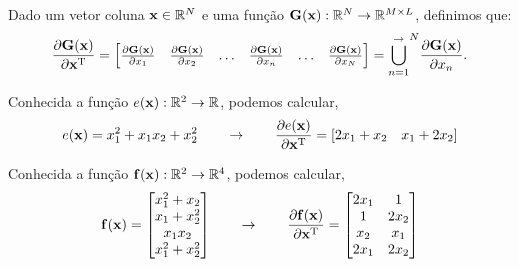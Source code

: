 \begin{definition}\label{def:deltahor3}
Dado 
um vetor coluna $\VECTOR{x}\in \mathbb{R}^N$ e 
uma função $\MATRIX{G}(\VECTOR{x}): \mathbb{R}^N \rightarrow \mathbb{R}^{M\times L}$, 
definimos que:
\begin{equation}
\frac{\partial \MATRIX{G}(\VECTOR{x}) }{\partial \VECTOR{x}^{\transpose}}= 
\left[
\begin{matrix}
\frac{\partial \MATRIX{G}(\VECTOR{x}) }{\partial x_{1}}&
\frac{\partial \MATRIX{G}(\VECTOR{x}) }{\partial x_{2}}&
\hdots&
\frac{\partial \MATRIX{G}(\VECTOR{x}) }{\partial x_{n}}&
\hdots&
\frac{\partial \MATRIX{G}(\VECTOR{x}) }{\partial x_{N}}
\end{matrix}
\right]= {\bigcup\limits_{n=1}^{\rightarrow}}^{N}{\frac{\partial \MATRIX{G}(\VECTOR{x}) }{\partial x_{n}}}.
\end{equation}
\end{definition}

\begin{comment}
Assim, obtemos o vetor linha
$\frac{\partial e(\VECTOR{x}) }{\partial \VECTOR{x}^{\transpose}} \in \mathbb{R}^{1\times N}$,
as matrizes
$\frac{\partial \VECTOR{f}(\VECTOR{x}) }{\partial \VECTOR{x}^{\transpose}} \in \mathbb{R}^{M \times N}$ e
$\frac{\partial \VECTOR{g}(\VECTOR{x}) }{\partial \VECTOR{x}^{\transpose}} \in \mathbb{R}^{M \times (LN)}$.
\end{comment}

\begin{example}
Conhecida a função $e(\VECTOR{x}): \mathbb{R}^2 \rightarrow \mathbb{R}$, podemos calcular,
\begin{equation}
e(\VECTOR{x})=x_1^2+x_1 x_2+x_2^2
\qquad \rightarrow \qquad
\frac{\partial e(\VECTOR{x}) }{\partial \VECTOR{x}^{\transpose}}=
\left[ 2 x_1+x_2 \quad x_1 + 2 x_2\right]
\end{equation}
\end{example}


\begin{example}
Conhecida a função $\VECTOR{f}(\VECTOR{x}): \mathbb{R}^2 \rightarrow \mathbb{R}^4$, podemos calcular,
\begin{equation}
\VECTOR{f}(\VECTOR{x})=
\begin{bmatrix}
x_1^2+x_2\\
x_1+x_2^2\\
x_1 x_2 \\
x_1^2+x_2^2
\end{bmatrix}
\qquad \rightarrow \qquad
\frac{\partial \VECTOR{f}(\VECTOR{x}) }{\partial \VECTOR{x}^{\transpose}}= 
\begin{bmatrix}
2 x_1 & 1\\
1     & 2 x_2\\
x_2   & x_1\\
2 x_1 & 2 x_2
\end{bmatrix}
\end{equation}
\end{example}

